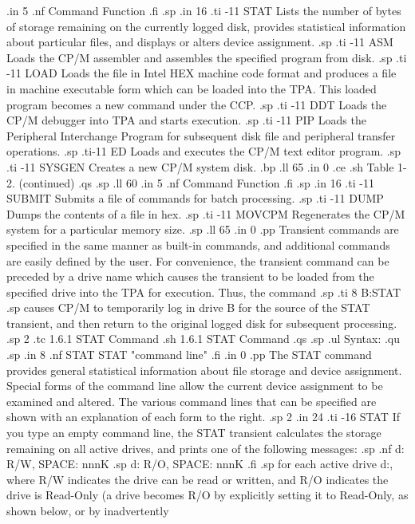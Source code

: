 .in 5
.nf
Command                      Function
.fi
.sp
.in 16
.ti -11
STAT       Lists the number of bytes of storage remaining on the currently
logged disk, provides statistical information about particular files, and
displays or alters device assignment.
.sp
.ti -11
ASM        Loads the CP/M assembler and assembles the specified program from
disk.
.sp
.ti -11
LOAD       Loads the file in Intel HEX machine code format and produces a
file in machine executable form which can be loaded into the TPA.  This loaded
program becomes a new command under the CCP.
.sp
.ti -11
DDT        Loads the CP/M debugger into TPA and starts execution.
.sp
.ti -11
PIP        Loads the Peripheral Interchange Program for subsequent disk file
and peripheral transfer operations.
.sp
.ti-11
ED         Loads and executes the CP/M text editor program.
.sp
.ti -11
SYSGEN     Creates a new CP/M system disk.
.bp
.ll 65
.in 0
.ce
.sh
Table 1-2.  (continued)
.qs
.sp
.ll 60
.in 5
.nf
Command                      Function
.fi
.sp
.in 16
.ti -11
SUBMIT     Submits a file of commands for batch processing.
.sp
.ti -11
DUMP       Dumps the contents of a file in hex.
.sp
.ti -11
MOVCPM     Regenerates the CP/M system for a particular memory size.
.sp
.ll 65
.in 0
.pp
Transient commands are specified in the same manner as built-in commands, and
additional commands are easily defined by the user.  For convenience, the
transient command can be preceded by a drive name which causes the transient
to be loaded from the specified drive into the TPA for execution.  Thus, the
command
.sp
.ti 8
B:STAT
.sp
causes CP/M to temporarily log in drive B for the source of the STAT
transient, and then return to the original logged disk for subsequent
processing.
.sp 2
.tc         1.6.1  STAT Command
.sh
1.6.1  STAT Command
.qs
.sp
.ul
Syntax:
.qu
.sp
.in 8
.nf
STAT
STAT "command line"
.fi
.in 0
.pp
The STAT command provides general statistical information about file storage
and device assignment.  Special forms of the command line allow the current
device assignment to be
examined and altered.  The various command lines that can be specified are
shown with an explanation of each form to the right.
.sp 2
.in 24
.ti -16
STAT            If you type an empty command line, the STAT transient
calculates the storage remaining on all active drives, and prints 
one of the following messages:
.sp
.nf
d: R/W, SPACE:  nnnK
.sp
d: R/O, SPACE:  nnnK
.fi
.sp
for each active drive d:, where R/W indicates the drive can be read or
written, and R/O indicates the drive is Read-Only (a drive becomes R/O by
explicitly setting it to Read-Only, as shown below, or by inadvertently
